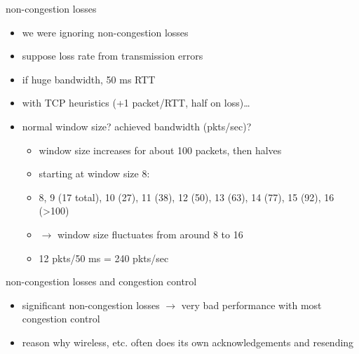 \begin{frame}{non-congestion losses}
    \begin{itemize}
    \item we were ignoring non-congestion losses
    \item suppose  loss rate from transmission errors
    \item if huge bandwidth, 50 ms RTT
    \item with TCP heuristics (+1 packet/RTT, half on loss)\ldots
    \item normal window size? achieved bandwidth (pkts/sec)?
        \begin{itemize}
        \item<2-> window size increases for about 100 packets, then halves
        \item<2-> starting at window size 8:
        \item<2-> 8, 9 (17 total), 10 (27), 11 (38), 12 (50), 13 (63), 14 (77), 15 (92), 16 (>100)
        \item<2-> $\rightarrow$ window size fluctuates from around 8 to 16
        \item<3-> 12 pkts/50 ms = 240 pkts/sec
        \end{itemize}
    \end{itemize}
\end{frame}

\begin{frame}{non-congestion losses and congestion control}
    \begin{itemize}
    \item significant non-congestion losses $\rightarrow$ very bad performance with most congestion control
    \item reason why wireless, etc. often does its own acknowledgements and resending
    \end{itemize}
\end{frame}
